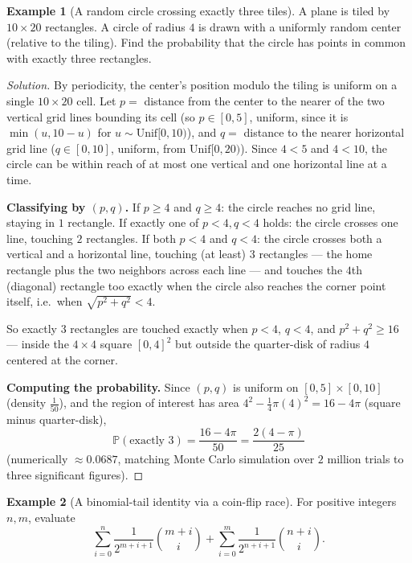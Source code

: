 \documentclass[11pt]{article}
\theoremstyle{definition}
\newtheorem{example}{Example}[section]
\begin{document}
\begin{example}[A random circle crossing exactly three tiles]
A plane is tiled by $10\times20$ rectangles. A circle of radius $4$ is drawn with a uniformly random center (relative to the tiling). Find the probability that the circle has points in common with exactly three rectangles.
\end{example}

\begin{proof}[Solution]
By periodicity, the center's position modulo the tiling is uniform on a single $10\times20$ cell. Let $p=$ distance from the center to the nearer of the two vertical grid lines bounding its cell (so $p\in[0,5]$, uniform, since it is $\min(u,10-u)$ for $u\sim\mathrm{Unif}[0,10)$), and $q=$ distance to the nearer horizontal grid line ($q\in[0,10]$, uniform, from $\mathrm{Unif}[0,20)$). Since $4<5$ and $4<10$, the circle can be within reach of at most one vertical and one horizontal line at a time.

\textbf{Classifying by $(p,q)$.} If $p\ge4$ and $q\ge4$: the circle reaches no grid line, staying in $1$ rectangle. If exactly one of $p<4,q<4$ holds: the circle crosses one line, touching $2$ rectangles. If both $p<4$ and $q<4$: the circle crosses both a vertical and a horizontal line, touching (at least) $3$ rectangles — the home rectangle plus the two neighbors across each line — and touches the $4$th (diagonal) rectangle too exactly when the circle also reaches the corner point itself, i.e.\ when $\sqrt{p^2+q^2}<4$.

So exactly $3$ rectangles are touched exactly when $p<4$, $q<4$, and $p^2+q^2\ge16$ — inside the $4\times4$ square $[0,4]^2$ but outside the quarter-disk of radius $4$ centered at the corner.

\textbf{Computing the probability.} Since $(p,q)$ is uniform on $[0,5]\times[0,10]$ (density $\tfrac1{50}$), and the region of interest has area $4^2-\tfrac14\pi(4)^2=16-4\pi$ (square minus quarter-disk),
\[
\mathbb P(\text{exactly } 3)=\frac{16-4\pi}{50}=\boxed{\frac{2(4-\pi)}{25}}
\]
(numerically $\approx0.0687$, matching Monte Carlo simulation over $2$ million trials to three significant figures).
\end{proof}

\begin{example}[A binomial-tail identity via a coin-flip race]
For positive integers $n,m$, evaluate
\[
\sum_{i=0}^n\frac1{2^{m+i+1}}\binom{m+i}i+\sum_{i=0}^m\frac1{2^{n+i+1}}\binom{n+i}i.
\]
\end{example}
\end{document}
